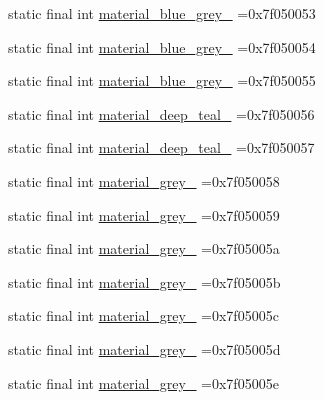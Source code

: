 \begin{DoxyCompactItemize}
\item 
static final int \mbox{\hyperlink{classbr_1_1unb_1_1cic_1_1mp_1_1marketmaster_1_1test_1_1R_1_1color_ae7c1ae22bb89bb5c764b5f98709e3e8a}{material\+\_\+blue\+\_\+grey\+\_}} =0x7f050053
\item 
static final int \mbox{\hyperlink{classbr_1_1unb_1_1cic_1_1mp_1_1marketmaster_1_1test_1_1R_1_1color_a112f59cfd3df6cf55281f8267f8f2496}{material\+\_\+blue\+\_\+grey\+\_}} =0x7f050054
\item 
static final int \mbox{\hyperlink{classbr_1_1unb_1_1cic_1_1mp_1_1marketmaster_1_1test_1_1R_1_1color_aada56b2b857dd23aa7e82b276e7e8a28}{material\+\_\+blue\+\_\+grey\+\_}} =0x7f050055
\item 
static final int \mbox{\hyperlink{classbr_1_1unb_1_1cic_1_1mp_1_1marketmaster_1_1test_1_1R_1_1color_af914dace31a74f9656741718b5d0eeab}{material\+\_\+deep\+\_\+teal\+\_}} =0x7f050056
\item 
static final int \mbox{\hyperlink{classbr_1_1unb_1_1cic_1_1mp_1_1marketmaster_1_1test_1_1R_1_1color_a075d2b8d2a32df43ff9e811453dfe2f5}{material\+\_\+deep\+\_\+teal\+\_}} =0x7f050057
\item 
static final int \mbox{\hyperlink{classbr_1_1unb_1_1cic_1_1mp_1_1marketmaster_1_1test_1_1R_1_1color_ae15d5f45480f9605ce5d55f363973a07}{material\+\_\+grey\+\_}} =0x7f050058
\item 
static final int \mbox{\hyperlink{classbr_1_1unb_1_1cic_1_1mp_1_1marketmaster_1_1test_1_1R_1_1color_a1c4548ee5490ebe958c597bcae26223b}{material\+\_\+grey\+\_}} =0x7f050059
\item 
static final int \mbox{\hyperlink{classbr_1_1unb_1_1cic_1_1mp_1_1marketmaster_1_1test_1_1R_1_1color_a575da946e7ae2d055868c2b0cc6762fd}{material\+\_\+grey\+\_}} =0x7f05005a
\item 
static final int \mbox{\hyperlink{classbr_1_1unb_1_1cic_1_1mp_1_1marketmaster_1_1test_1_1R_1_1color_a6f4d18b4f70cf494af2268d985d43fca}{material\+\_\+grey\+\_}} =0x7f05005b
\item 
static final int \mbox{\hyperlink{classbr_1_1unb_1_1cic_1_1mp_1_1marketmaster_1_1test_1_1R_1_1color_a5aea0dca4749067f1f602845b95114bd}{material\+\_\+grey\+\_}} =0x7f05005c
\item 
static final int \mbox{\hyperlink{classbr_1_1unb_1_1cic_1_1mp_1_1marketmaster_1_1test_1_1R_1_1color_a577209426c8895efa895b3b2077a9a61}{material\+\_\+grey\+\_}} =0x7f05005d
\item 
static final int \mbox{\hyperlink{classbr_1_1unb_1_1cic_1_1mp_1_1marketmaster_1_1test_1_1R_1_1color_a029b6500eb14798c98a05089472dafef}{material\+\_\+grey\+\_}} =0x7f05005e

\end{DoxyCompactItemize}
